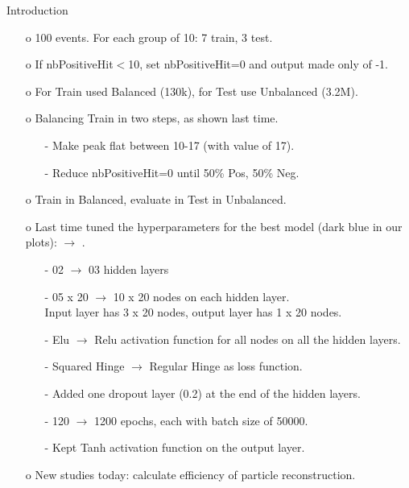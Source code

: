 \documentclass{beamer}
\begin{document}
\begin{frame}{Introduction}
\begin{enumerate}
\item[o] 100 events. For each group of 10: 7 train, 3 test.  
\item[o] If nbPositiveHit$<$10, set nbPositiveHit=0 and output made only of -1.
\item[o] For Train used Balanced (130k), for Test use Unbalanced (3.2M).
\item[o] Balancing Train in two steps, as shown last time.
\begin{enumerate}
\item[-] Make peak flat between 10-17 (with value of 17).
\item[-] Reduce nbPositiveHit=0 until 50\% Pos, 50\% Neg.
\end{enumerate}
\item[o] Train in Balanced, evaluate in Test in Unbalanced.
\item[o] Last time tuned the hyperparameters for the best model (dark blue in our plots): \texttt{} $\rightarrow$ \texttt{}.
\begin{enumerate}
\item[-] 02 $\rightarrow$ 03 hidden layers
\item[-] 05 x 20 $\rightarrow$ 10 x 20 nodes on each hidden layer. \\ Input layer has 3 x 20 nodes, output layer has 1 x 20 nodes.
\item[-] Elu $\rightarrow$ Relu activation function for all nodes on all the hidden layers. 
\item[-] Squared Hinge $\rightarrow$ Regular Hinge as loss function.
\item[-] Added one dropout layer (0.2) at the end of the hidden layers.
\item[-] 120 $\rightarrow$ 1200 epochs, each with batch size of 50000.
\item[-] Kept Tanh activation function on the output layer.
\end{enumerate}
\item[o] New studies today: calculate efficiency of particle reconstruction.
\end{enumerate}
\end{frame}
\clearpage
\end{document}
